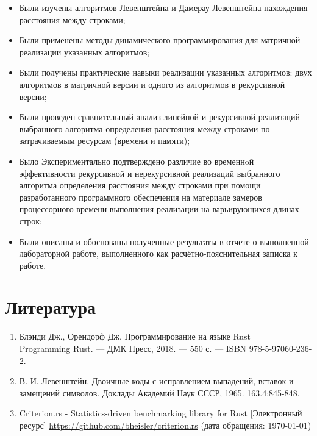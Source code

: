 \documentclass[12pt]{report}
\begin{document}
	\begin{itemize}
		\item Были изучены алгоритмов Левенштейна и Дамерау-Левенштейна нахождения расстояния между строками;
		\item Были применены методы динамического программирования для матричной реализации указанных алгоритмов;
		\item Были получены практические навыки реализации указанных алгоритмов: двух алгоритмов в матричной версии и одного из алгоритмов в рекурсивной версии;
		\item Были проведен сравнительный анализ линейной и рекурсивной реализаций выбранного алгоритма определения расстояния между строками по затрачиваемым ресурсам (времени и памяти);
		\item Было Экспериментально подтверждено различие во временнoй эффективности рекурсивной и нерекурсивной реализаций выбранного алгоритма определения расстояния между строками при помощи разработанного программного обеспечения на материале замеров процессорного времени выполнения реализации на варьирующихся длинах строк;
		\item Были описаны и обоснованы полученные результаты в отчете о выполненной лабораторной работе, выполненного как расчётно-пояснительная записка к работе.
	\end{itemize}

	\chapter*{Литература}

	\begin{enumerate}
		\item Блэнди Дж., Орендорф Дж. Программирование на языке Rust = Programming Rust. — ДМК Пресс, 2018. — 550 с. — ISBN 978-5-97060-236-2.
		\item В. И. Левенштейн. Двоичные коды с исправлением выпадений, вставок и замещений символов. Доклады Академий Наук СССР, 1965. 163.4:845-848.
		\item Criterion.rs - Statistics-driven benchmarking library for Rust [Электронный ресурс] \url{https://github.com/bheisler/criterion.rs} (дата обращения: \today)
	\end{enumerate}
\end{document}
